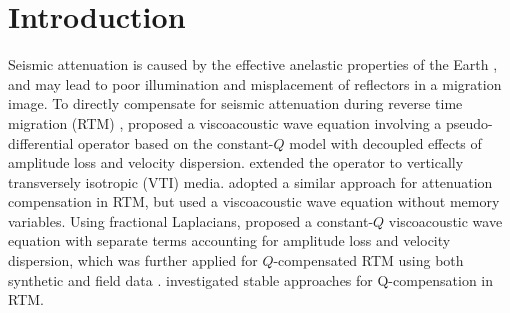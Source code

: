 \section{Introduction}
Seismic attenuation is caused by the effective anelastic properties of the Earth \cite[]{aki,carc}, and may lead to poor illumination and misplacement of reflectors in a migration image. To directly compensate for seismic attenuation during reverse time migration (RTM) \cite[]{baysal83,McMechan83,whitmore83}, \cite{zhang10} proposed a viscoacoustic wave equation involving a pseudo-differential operator based on the constant-$Q$ model \cite[]{kja79} with decoupled effects of amplitude loss and velocity dispersion. \cite{suh12} extended the operator to vertically transversely isotropic (VTI) media. \cite{bai13} adopted a similar approach for attenuation compensation in RTM, but used a viscoacoustic wave equation without memory variables. Using fractional Laplacians, \cite{zhu14a} proposed a constant-$Q$ viscoacoustic wave equation with separate terms accounting for amplitude loss and velocity dispersion, which was further applied for $Q$-compensated RTM using both synthetic and field data \cite[]{zhu14b,zhu15fld}. \cite{fletcher12,me15c} investigated stable approaches for Q-compensation in RTM. 


